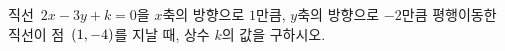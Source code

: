 직선~$2x-3y+k=0$을 $x$축의 방향으로 $1$만큼, $y$축의 방향으로 $-2$만큼 평행이동한 직선이 점~$(1{,}\mkern3mu\mathopen{}-4)$를 지날 때, 상수 $k$의 값을 구하시오.
